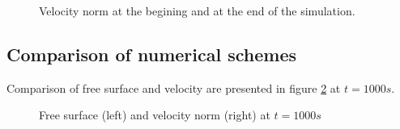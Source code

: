 \begin{figure}[H]
\begin{minipage}[t]{0.5\textwidth}
 \centering
\end{minipage}%
\begin{minipage}[t]{0.5\textwidth}
 \centering
\end{minipage}
 \caption{Velocity norm at the begining and at the end of the simulation.}
 \label{fig:res:velocity}
\end{figure}


\subsection{Comparison of numerical schemes}

Comparison of free surface and velocity are presented in figure \ref{fig:res:comparison} at $t= 1000s$.

\begin{figure}[H]
\begin{minipage}[t]{0.5\textwidth}
 \centering
\end{minipage}%
\begin{minipage}[t]{0.5\textwidth}
 \centering
\end{minipage}
\begin{minipage}[t]{0.5\textwidth}
 \centering
\end{minipage}%
\begin{minipage}[t]{0.5\textwidth}
 \centering
\end{minipage}
\begin{minipage}[t]{0.5\textwidth}
 \centering
\end{minipage}%
\begin{minipage}[t]{0.5\textwidth}
 \centering
\end{minipage}
 \caption{Free surface (left) and velocity norm (right) at $t=1000s$}
 \label{fig:res:comparison}
\end{figure}


